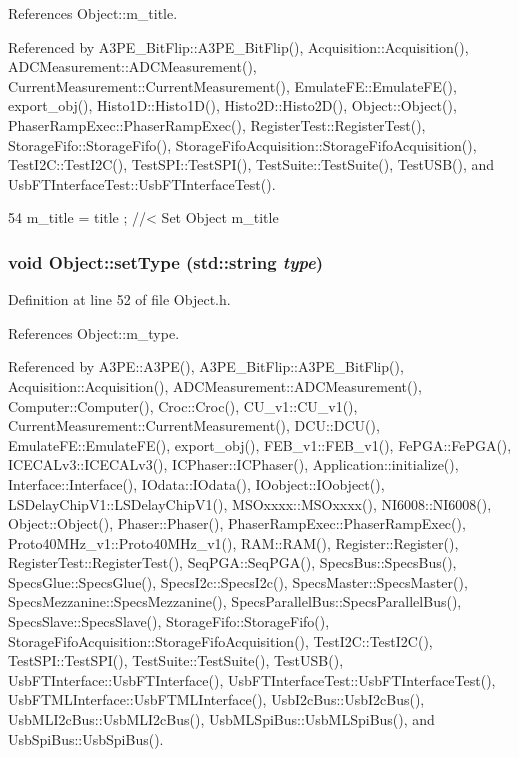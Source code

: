 References Object::m\_\-title.

Referenced by A3PE\_\-BitFlip::A3PE\_\-BitFlip(), Acquisition::Acquisition(), ADCMeasurement::ADCMeasurement(), CurrentMeasurement::CurrentMeasurement(), EmulateFE::EmulateFE(), export\_\-obj(), Histo1D::Histo1D(), Histo2D::Histo2D(), Object::Object(), PhaserRampExec::PhaserRampExec(), RegisterTest::RegisterTest(), StorageFifo::StorageFifo(), StorageFifoAcquisition::StorageFifoAcquisition(), TestI2C::TestI2C(), TestSPI::TestSPI(), TestSuite::TestSuite(), TestUSB(), and UsbFTInterfaceTest::UsbFTInterfaceTest().


\begin{DoxyCode}
54 { m_title = title ; } //< Set Object m_title
\end{DoxyCode}
\hypertarget{classObject_aae534cc9d982bcb9b99fd505f2e103a5}{
\subsubsection[{setType}]{\setlength{\rightskip}{0pt plus 5cm}void Object::setType (std::string {\em type})}}
\label{classObject_aae534cc9d982bcb9b99fd505f2e103a5}


Definition at line 52 of file Object.h.

References Object::m\_\-type.

Referenced by A3PE::A3PE(), A3PE\_\-BitFlip::A3PE\_\-BitFlip(), Acquisition::Acquisition(), ADCMeasurement::ADCMeasurement(), Computer::Computer(), Croc::Croc(), CU\_\-v1::CU\_\-v1(), CurrentMeasurement::CurrentMeasurement(), DCU::DCU(), EmulateFE::EmulateFE(), export\_\-obj(), FEB\_\-v1::FEB\_\-v1(), FePGA::FePGA(), ICECALv3::ICECALv3(), ICPhaser::ICPhaser(), Application::initialize(), Interface::Interface(), IOdata::IOdata(), IOobject::IOobject(), LSDelayChipV1::LSDelayChipV1(), MSOxxxx::MSOxxxx(), NI6008::NI6008(), Object::Object(), Phaser::Phaser(), PhaserRampExec::PhaserRampExec(), Proto40MHz\_\-v1::Proto40MHz\_\-v1(), RAM::RAM(), Register::Register(), RegisterTest::RegisterTest(), SeqPGA::SeqPGA(), SpecsBus::SpecsBus(), SpecsGlue::SpecsGlue(), SpecsI2c::SpecsI2c(), SpecsMaster::SpecsMaster(), SpecsMezzanine::SpecsMezzanine(), SpecsParallelBus::SpecsParallelBus(), SpecsSlave::SpecsSlave(), StorageFifo::StorageFifo(), StorageFifoAcquisition::StorageFifoAcquisition(), TestI2C::TestI2C(), TestSPI::TestSPI(), TestSuite::TestSuite(), TestUSB(), UsbFTInterface::UsbFTInterface(), UsbFTInterfaceTest::UsbFTInterfaceTest(), UsbFTMLInterface::UsbFTMLInterface(), UsbI2cBus::UsbI2cBus(), UsbMLI2cBus::UsbMLI2cBus(), UsbMLSpiBus::UsbMLSpiBus(), and UsbSpiBus::UsbSpiBus().



